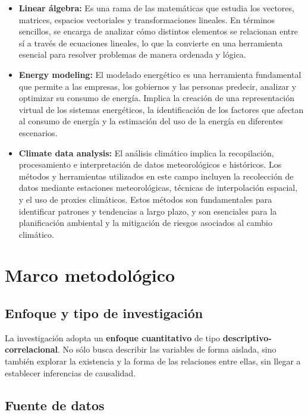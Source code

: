 \documentclass[oneside,11pt]{Latex/Classes/PhDthesisPSnPDF}
\begin{document}
\begin{itemize}
  computación cuántica universal y es compatible con diferentes tipos de
  hardware cuántico, como qubits superconductores e iones atrapados.
\item
  \textbf{Linear álgebra:} Es una rama de las matemáticas que estudia
  los vectores, matrices, espacios vectoriales y transformaciones
  lineales. En términos sencillos, se encarga de analizar cómo distintos
  elementos se relacionan entre sí a través de ecuaciones lineales, lo
  que la convierte en una herramienta esencial para resolver problemas
  de manera ordenada y lógica.
\item
  \textbf{Energy modeling:} El modelado energético es una herramienta
  fundamental que permite a las empresas, los gobiernos y las personas
  predecir, analizar y optimizar su consumo de energía. Implica la
  creación de una representación virtual de los sistemas energéticos, la
  identificación de los factores que afectan al consumo de energía y la
  estimación del uso de la energía en diferentes escenarios.
\item
  \textbf{Climate data analysis:} El análisis climático implica la
  recopilación, procesamiento e interpretación de datos meteorológicos e
  históricos. Los métodos y herramientas utilizados en este campo
  incluyen la recolección de datos mediante estaciones meteorológicas,
  técnicas de interpolación espacial, y el uso de proxies climáticos.
  Estos métodos son fundamentales para identificar patrones y tendencias
  a largo plazo, y son esenciales para la planificación ambiental y la
  mitigación de riesgos asociados al cambio climático.
\end{itemize}

\section{Marco metodológico}

\subsection{Enfoque y tipo de investigación}

La investigación adopta un \textbf{enfoque cuantitativo} de tipo
\textbf{descriptivo-correlacional}. No sólo busca describir las
variables de forma aislada, sino también explorar la existencia y la
forma de las relaciones entre ellas, sin llegar a establecer inferencias
de causalidad.

\subsection{Fuente de datos}
\end{document}
